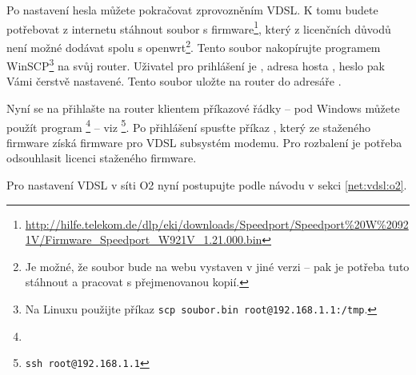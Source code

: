 Po nastavení hesla můžete pokračovat zprovozněním VDSL.
K tomu budete
potřebovat z internetu stáhnout soubor s firmware\footnote{
\url{http://hilfe.telekom.de/dlp/eki/downloads/Speedport/Speedport\%20W\%20921V/Firmware\_Speedport\_W921V\_1.21.000.bin}},
který z licenčních důvodů není možné dodávat spolu s \gls{openwrt}\footnote{
Je možné, že soubor bude na webu vystaven v jiné verzi -- pak je potřeba tuto
stáhnout a pracovat s přejmenovanou kopií.
}.
Tento soubor nakopírujte programem WinSCP\footnote{Na Linuxu použijte příkaz
{\texttt{scp soubor.bin root@192.168.1.1:/tmp}}.} na svůj router. Uživatel pro prihlášení
je , adresa hosta , heslo pak Vámi čerstvě nastavené.
Tento soubor uložte na router do adresáře .

Nyní se na přihlašte na router klientem příkazové řádky -- pod Windows můžete
použít program \footnote{} -- viz \footnote{\texttt{ssh root@192.168.1.1}}.
Po přihlášení spusťte příkaz , který ze staženého firmware
získá firmware pro VDSL subsystém modemu. Pro rozbalení je potřeba odsouhlasit
licenci staženého firmware.

Pro nastavení VDSL v síti O2 nyní postupujte podle návodu v sekci \ref{net:vdsl:o2}.
